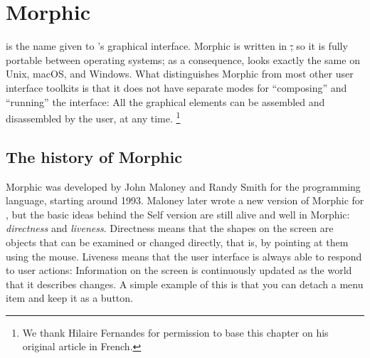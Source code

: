 \documentclass[a4paper,10pt,twoside]{book}
\begin{document}
	\renewcommand{\nnbb}[2]{} %
\fi
\chapter{Morphic}


 is the name given to \sq's graphical interface.
Morphic is written in \st, so it is fully portable between operating systems; as a consequence, \sq looks exactly the same on Unix, macOS, and Windows.
What distinguishes Morphic from most other user interface toolkits is that it does not have separate modes for ``composing'' and ``running'' the interface:
All the graphical elements can be assembled and disassembled by the user, at any time.%
\footnote{We thank Hilaire Fernandes for permission to base this chapter on his original article in French.}



\section{The history of Morphic}

Morphic was developed by John Maloney and Randy Smith for the  programming language, starting around 1993.
Maloney later wrote a new version of Morphic for \sq, but the basic ideas behind the Self version are still alive and well in \sq Morphic: \emph{directness} and \emph{liveness}.
Directness means that the shapes on the screen are objects that can be examined or changed directly, that is, by pointing at them using the mouse.
Liveness means that the user interface is always able to respond to user actions:
Information on the screen is continuously updated as the world that it describes changes.
A simple example of this is that you can detach a menu item and keep it as a button.
\end{document}

